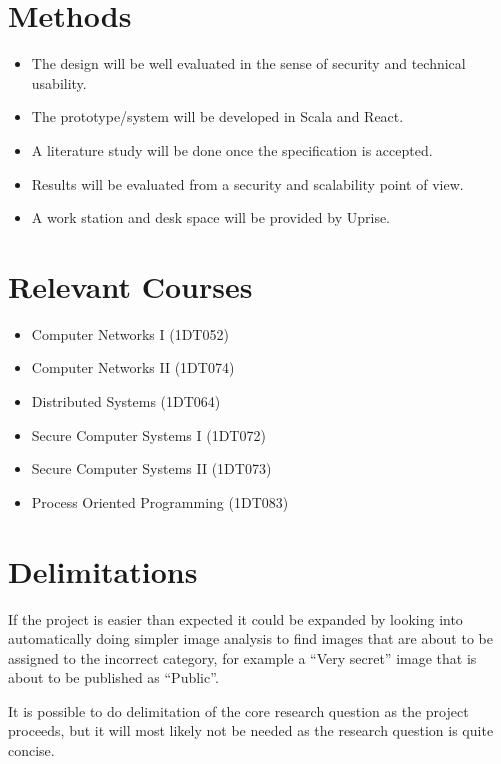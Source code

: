 \documentclass[a4paper,12pt]{article}
\begin{document}
\newpage
\section{Methods}
\begin{itemize}
  \item The design will be well evaluated in the sense of security and technical usability.
  \item The prototype/system will be developed in Scala and React. 
  \item A literature study will be done once the specification is accepted. 
  \item Results will be evaluated from a security and scalability point of view. 
  \item A work station and desk space will be provided by Uprise.
\end{itemize}

\section{Relevant Courses}
\begin{itemize}
  \item Computer Networks I (1DT052)
  \item Computer Networks II (1DT074)
  \item Distributed Systems (1DT064)
  \item Secure Computer Systems I (1DT072)
  \item Secure Computer Systems II (1DT073)
  \item Process Oriented Programming (1DT083)
\end{itemize}

\section{Delimitations}
If the project is easier than expected it could be expanded by looking into 
automatically doing simpler image analysis to find images that are about to 
be assigned to the incorrect category, for example a ``Very secret'' image 
that is about to be published as ``Public''.

It is possible to do delimitation of the core research question as the project 
proceeds, but it will most likely not be needed as the research question is 
quite concise.

\newpage
\end{document}
